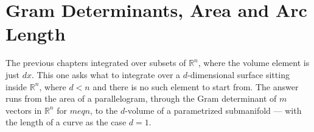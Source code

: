 \chapter{Gram Determinants, Area and Arc Length}
\label{ch:gram_determinant}

The previous chapters integrated over subsets of $\mathbb{R}^n$, where the volume element is
just $dx$. This one asks what to integrate over a $d$-dimensional surface sitting inside
$\mathbb{R}^n$, where $d < n$ and there is no such element to start from. The answer runs from
the area of a parallelogram, through the Gram determinant of $m$ vectors in $\mathbb{R}^n$ for
$m 
eq n$, to the $d$-volume of a parametrized submanifold --- with the length of a curve as
the case $d = 1$.





